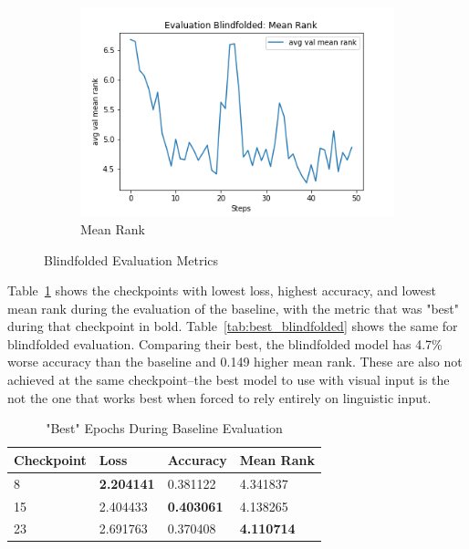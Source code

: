 \begin{figure}[H]
\begin{subfigure}[b]{0.3\textwidth}
         \includegraphics[width=\textwidth]{./figure/results/baseline_and_blindfolding/blindfolded/avg val mean rank.png}
         \caption{Mean Rank}
         \label{fig:blindfolded_mean_rank}
     \end{subfigure}
     \caption{Blindfolded Evaluation Metrics}
     \label{fig:blindfolded_metrics}
\end{figure}
Table~\ref{tab:best_baseline} shows the checkpoints with lowest loss, highest accuracy, and lowest mean rank during the evaluation of the baseline, with the metric that was "best" during that checkpoint in bold. Table~\ref{tab:best_blindfolded} shows the same for blindfolded evaluation. Comparing their best, the blindfolded model has 4.7\% worse accuracy than the baseline and 0.149 higher mean rank. These are also not achieved at the same checkpoint--the best model to use with visual input is the not the one that works best when forced to rely entirely on linguistic input. \newline %
\begin{table}[H]
\centering
\caption{"Best" Epochs During Baseline Evaluation}
\begin{tabular}{l | l | l | l}
Checkpoint & Loss & Accuracy & Mean Rank \\
\hline
8 & \textbf{2.204141} & 0.381122 & 4.341837 \\
15 & 2.404433 & \textbf{0.403061} & 4.138265 \\
23 & 2.691763 & 0.370408 & \textbf{4.110714}
\end{tabular}
\label{tab:best_baseline}
\end{table}

